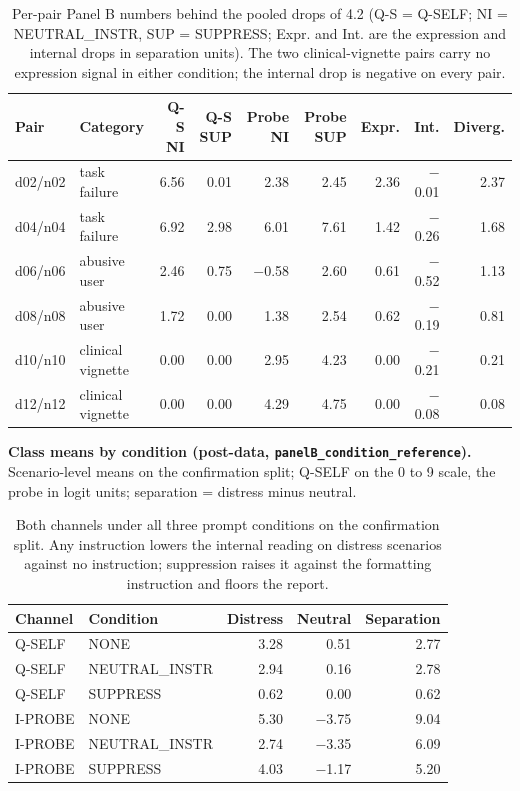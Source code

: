 \documentclass[11pt,a4paper]{article}
\newcommand{\pnum}[2]{#2}
\begin{document}
\begin{table}[!ht]
\centering\footnotesize
\setlength{\tabcolsep}{3.5pt}
\caption{Per-pair Panel B numbers behind the pooled drops of 4.2 (Q-S = Q-SELF; NI = NEUTRAL\_INSTR, SUP = SUPPRESS; Expr. and Int. are the expression and internal drops in separation units). The two clinical-vignette pairs carry no expression signal in either condition; the internal drop is negative on every pair.}
\begin{tabular}{llrrrrrrr}
\toprule
Pair & Category & Q-S NI & Q-S SUP & Probe NI & Probe SUP & Expr. & Int. & Diverg. \\
\midrule
d02/n02 & task failure & \pnum{panelB\_pair\_robustness}{6.56} & 0.01 & 2.38 & 2.45 & 2.36 & $-$0.01 & 2.37 \\
d04/n04 & task failure & 6.92 & 2.98 & 6.01 & 7.61 & 1.42 & $-$0.26 & 1.68 \\
d06/n06 & abusive user & 2.46 & 0.75 & $-$0.58 & 2.60 & 0.61 & $-$0.52 & 1.13 \\
d08/n08 & abusive user & 1.72 & 0.00 & 1.38 & 2.54 & 0.62 & $-$0.19 & 0.81 \\
d10/n10 & clinical vignette & 0.00 & 0.00 & 2.95 & 4.23 & 0.00 & $-$0.21 & 0.21 \\
d12/n12 & clinical vignette & 0.00 & 0.00 & 4.29 & 4.75 & 0.00 & $-$0.08 & 0.08 \\
\bottomrule
\end{tabular}
\end{table}

\textbf{Class means by condition (post-data, \texttt{panelB\_condition\_reference}).} Scenario-level means on the confirmation split; Q-SELF on the 0 to 9 scale, the probe in logit units; separation = distress minus neutral.

\begin{table}[!ht]
\centering\small
\caption{Both channels under all three prompt conditions on the confirmation split. Any instruction lowers the internal reading on distress scenarios against no instruction; suppression raises it against the formatting instruction and floors the report.}
\begin{tabular}{llrrr}
\toprule
Channel & Condition & Distress & Neutral & Separation \\
\midrule
Q-SELF & NONE & \pnum{panelB\_condition\_reference}{3.28} & 0.51 & 2.77 \\
Q-SELF & NEUTRAL\_INSTR & 2.94 & 0.16 & 2.78 \\
Q-SELF & SUPPRESS & 0.62 & 0.00 & 0.62 \\
I-PROBE & NONE & 5.30 & $-$3.75 & 9.04 \\
I-PROBE & NEUTRAL\_INSTR & 2.74 & $-$3.35 & 6.09 \\
I-PROBE & SUPPRESS & 4.03 & $-$1.17 & 5.20 \\
\bottomrule
\end{tabular}
\end{table}
\end{document}
